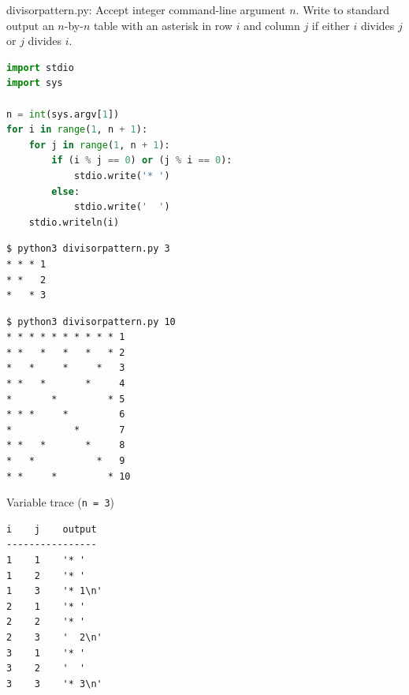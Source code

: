 \documentclass[8pt,a4paper,compress]{beamer}
\begin{document}
\begin{frame}[fragile]
\pause

\begin{framed}
\tiny divisorpattern.py: Accept integer command-line argument $n$. Write to standard output an $n$-by-$n$ table with an asterisk in row $i$ and column $j$ if either $i$ divides $j$ or $j$ divides $i$.
\end{framed}

\begin{lstlisting}[language=Python]
import stdio
import sys

n = int(sys.argv[1])
for i in range(1, n + 1):
    for j in range(1, n + 1):
        if (i % j == 0) or (j % i == 0):
            stdio.write('* ')
        else:
            stdio.write('  ')
    stdio.writeln(i)
\end{lstlisting}

\pause

\begin{minipage}{150pt}
\begin{lstlisting}[language={}]
$ python3 divisorpattern.py 3
* * * 1
* *   2
*   * 3
\end{lstlisting}
\begin{lstlisting}[language={}]
$ python3 divisorpattern.py 10
* * * * * * * * * * 1
* *   *   *   *   * 2
*   *     *     *   3
* *   *       *     4
*       *         * 5
* * *     *         6
*           *       7
* *   *       *     8
*   *           *   9
* *     *         * 10
\end{lstlisting}
\end{minipage}\hfill
\begin{minipage}{100pt}
Variable trace (\lstinline{n = 3})
\begin{lstlisting}[language={}]
i    j    output
----------------
1    1    '* '
1    2    '* '
1    3    '* 1\n'
2    1    '* '
2    2    '* '
2    3    '  2\n'
3    1    '* '
3    2    '  '  
3    3    '* 3\n'
\end{lstlisting}
\end{minipage}
\end{frame}
\end{document}
